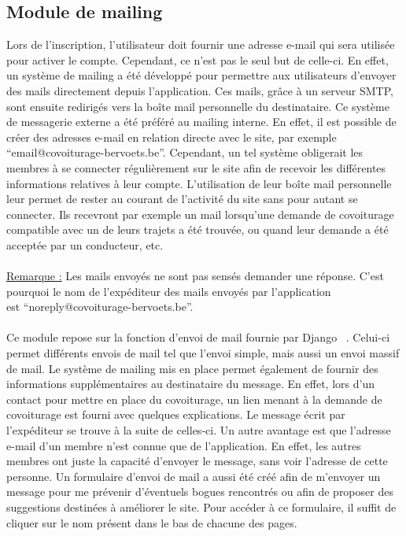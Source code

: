 \documentclass[12pt, a4paper, oneside]{article}
\begin{document}
\subsection{Module de mailing} \label{mail}
    Lors de l'inscription, l'utilisateur doit fournir une adresse e-mail qui sera utilisée pour activer le compte. Cependant, ce n'est pas le seul but de celle-ci. En effet, un système de mailing a été développé pour permettre aux utilisateurs d'envoyer des mails directement depuis l'application. Ces mails, grâce à un serveur SMTP, sont ensuite redirigés vers la boîte mail personnelle du destinataire. Ce système de messagerie externe a été préféré au mailing interne. En effet, il est possible de créer des adresses e-mail en relation directe avec le site, par exemple ``email@covoiturage-bervoets.be''. Cependant, un tel système obligerait les membres à se connecter régulièrement sur le site afin de recevoir les différentes informations relatives à leur compte. L'utilisation de leur boîte mail personnelle leur permet de rester au courant de l'activité du site sans pour autant se connecter. Ils recevront par exemple un mail lorsqu'une demande de covoiturage compatible avec un de leurs trajets a été trouvée, ou quand leur demande a été acceptée par un conducteur, etc.\\\\
    \underline{Remarque :} Les mails envoyés ne sont pas sensés demander une réponse. C'est pourquoi le nom de l'expéditeur des mails envoyés par l'application \\est ``noreply@covoiturage-bervoets.be''.\\\\
    \indent Ce module repose sur la fonction d'envoi de mail fournie par Django ~\cite{django-mail}. Celui-ci permet différents envois de mail tel que l'envoi simple, mais aussi un envoi massif de mail. %
    Le système de mailing mis en place permet également de fournir des informations supplémentaires au destinataire du message. En effet, lors d'un contact pour mettre en place du covoiturage, un lien menant à la demande de covoiturage est fourni avec quelques explications. Le message écrit par l'expéditeur se trouve à la suite de celles-ci. Un autre avantage est que l'adresse e-mail d'un membre n'est connue que de l'application. En effet, les autres membres ont juste la capacité d'envoyer le message, sans voir l'adresse de cette personne. Un formulaire d'envoi de mail a aussi été créé afin de m'envoyer un message pour me prévenir d'éventuels bogues rencontrés ou afin de proposer des suggestions destinées à améliorer le site. Pour accéder à ce formulaire, il suffit de cliquer sur le nom présent dans le bas de chacune des pages.
\end{document}
